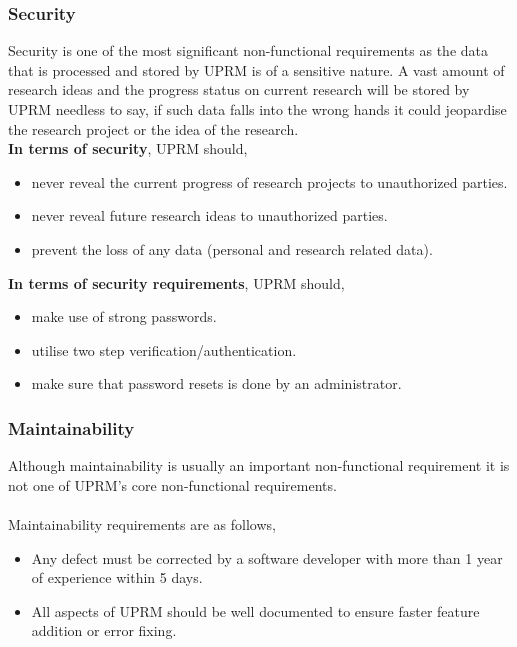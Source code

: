 \subsubsection{Security}
Security is one of the most significant non-functional requirements as the data that is processed and stored by UPRM is of a sensitive nature. 
A vast amount of research ideas and the progress status on current research will be stored by UPRM needless to say, if such data falls into the wrong hands it could jeopardise the research project or the idea of the research.\\ 

\textbf{In terms of security}, UPRM should,
	\begin{itemize} 
		\item never reveal the current progress of research projects to unauthorized parties.
		\item never reveal future research ideas to unauthorized parties.
		\item prevent the loss of any data (personal and research related data).
	\end{itemize}

\textbf{In terms of security requirements}, UPRM should,
	\begin{itemize} 
		\item make use of strong passwords.
		\item utilise two step verification/authentication.
		\item make sure that password resets is done by an administrator.
	\end{itemize}

\subsubsection{Maintainability}
	Although maintainability is usually an important non-functional requirement it is not one of UPRM's core non-functional requirements.\\ \\
Maintainability requirements are as follows,
\begin{itemize}
	\item Any defect must be corrected by a software developer with more than 1 year of experience within 5 days.
	\item All aspects of UPRM should be well documented to ensure faster feature addition or error fixing.
\end{itemize}


